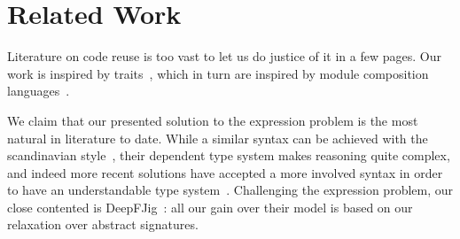 \saveSpace\saveSpace
\section{Related Work}
\saveSpace\saveSpace
Literature on code reuse is too vast to let us do justice of it in a few pages.
Our work is inspired by traits~\cite{ducasse2006traits}, which in turn
are inspired by module composition languages~\cite{ancona2002calculus}.

We claim that our presented solution to the expression problem is the most natural in literature to date.
While a similar syntax can be achieved with the scandinavian style~\cite{ernst2004expression}, their dependent type system makes reasoning quite complex, and indeed more recent solutions have accepted a more involved syntax in order to have an understandable type system~\cite{igarashi2005lightweight}.
Challenging the expression problem, our close contented is DeepFJig~\cite{deep}: all our gain over their model is based on our relaxation over abstract signatures.


\saveSpace
